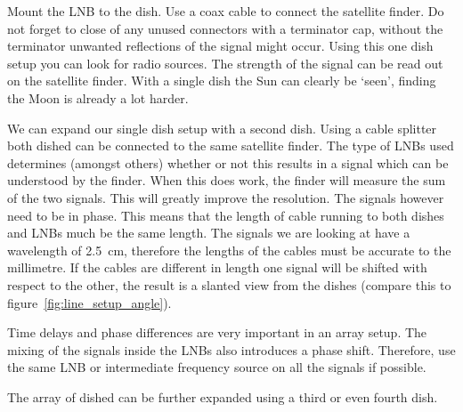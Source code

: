 \documentclass[12pt,a4paper]{article}
\numberwithin{equation}{section}
\numberwithin{figure}{section}
\numberwithin{table}{section}
\begin{document}
Mount the LNB to the dish. Use a coax cable to connect the satellite finder. Do not forget to close of any unused connectors with a terminator cap, without the terminator unwanted reflections of the signal might occur. Using this one dish setup you can look for radio sources. The strength of the signal can be read out on the satellite finder. With a single dish the Sun can clearly be `seen', finding the Moon is already a lot harder.

We can expand our single dish setup with a second dish. Using a cable splitter both dished can be connected to the same satellite finder. The type of LNBs used determines (amongst others) whether or not this results in a signal which can be understood by the finder. When this does work, the finder will measure the sum of the two signals. This will greatly improve the resolution. The signals however need to be in phase. This means that the length of cable running to both dishes and LNBs much be the same length. The signals we are looking at have a wavelength of 2.5~cm, therefore the lengths of the cables must be accurate to the millimetre. If the cables are different in length one signal will be shifted with respect to the other, the result is a slanted view from the dishes (compare this to figure~\ref{fig:line_setup_angle}).

Time delays and phase differences are very important in an array setup. The mixing of the signals inside the LNBs also introduces a phase shift. Therefore, use the same LNB or intermediate frequency source on all the signals if possible. 

The array of dished can be further expanded using a third or even fourth dish. 
\end{document}
